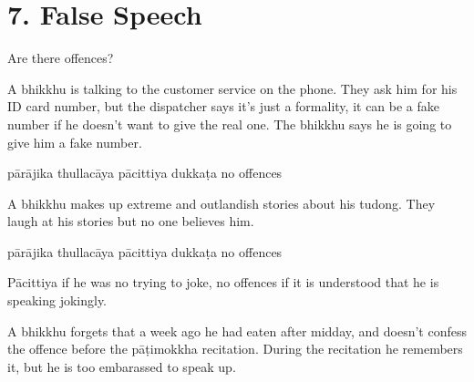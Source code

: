 \chapter{7. False Speech}
\renewcommand*{\theChapterTitle}{7. False Speech}

\begin{exam}{\autoExamName}

\begin{problem*}

Are there offences?

\begin{parts}

\item A bhikkhu is talking to the customer service on the phone. They ask him for
  his ID card number, but the dispatcher says it's just a formality, it can be a
  fake number if he doesn't want to give the real one. The bhikkhu says he is
  going to give him a fake number.

  \bigskip

  \begin{answers}{5}
    \bChoices
     pārājika\eAns
     thullacāya\eAns
     pācittiya\eAns
     dukkaṭa\eAns
     no offences\eAns
    \eChoices
  \end{answers}

  \bigskip

\item A bhikkhu makes up extreme and outlandish stories about his tudong. They
  laugh at his stories but no one believes him.

  \bigskip

  \begin{answers}{5}
    \bChoices
     pārājika\eAns
     thullacāya\eAns
     pācittiya\eAns
     dukkaṭa\eAns
     no offences\eAns
    \eChoices
  \end{answers}

  \begin{solution}
    Pācittiya if he was no trying to joke, no offences if it is understood that
    he is speaking jokingly.
  \end{solution}

  \bigskip

\item A bhikkhu forgets that a week ago he had eaten after midday, and doesn't
  confess the offence before the pāṭimokkha recitation. During the recitation he
  remembers it, but he is too embarassed to speak up.

  \bigskip


\end{parts}
\end{problem*}
\end{exam}
